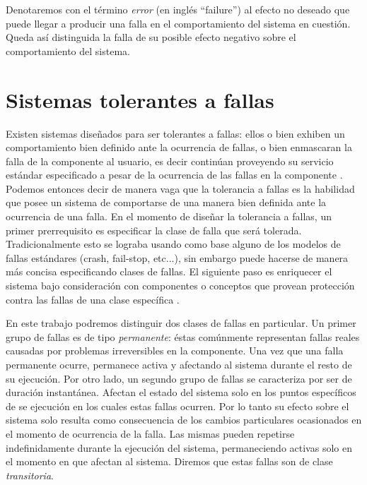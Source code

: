 \documentclass[titlepage, 12pt]{book}
\begin{document}
Denotaremos con el t\'ermino \textit{error} (en ingl\'es ``failure'') al efecto no deseado que puede llegar a producir una falla en el comportamiento del sistema en cuesti\'on. Queda as\'i distinguida la falla de su posible efecto negativo sobre el comportamiento del sistema.






\section{Sistemas tolerantes a fallas}
Existen sistemas dise\~nados para ser tolerantes a fallas: ellos o bien exhiben un comportamiento bien definido ante la ocurrencia de fallas, o bien enmascaran la falla de la componente al usuario, es decir contin\'uan proveyendo su servicio est\'andar especificado a pesar de la ocurrencia de las fallas en la componente \cite{Cristian}. Podemos entonces decir de manera vaga que la tolerancia a fallas es la habilidad que posee un sistema de comportarse de una manera bien definida ante la ocurrencia de una falla. En el momento de dise\~nar la tolerancia a fallas, un primer prerrequisito es especificar la clase de falla que ser\'a tolerada. Tradicionalmente esto se lograba usando como base alguno de los modelos de fallas est\'andares (crash, fail-stop, etc...), sin embargo puede hacerse de manera m\'as concisa especificando clases de fallas. El siguiente paso es enriquecer el sistema bajo consideraci\'on con componentes o conceptos que provean protecci\'on contra las fallas de una clase espec\'ifica \cite{FaultInject}.

En este trabajo podremos distinguir dos clases de fallas en particular. Un primer grupo de fallas es de tipo \textit{permanente}: \'estas com\'unmente representan fallas reales causadas por problemas irreversibles en la componente. Una vez que una falla permanente ocurre, permanece activa y afectando al sistema durante el resto de su ejecuci\'on. Por otro lado, un segundo grupo de fallas se caracteriza por ser de duraci\'on instant\'anea. Afectan el estado del sistema solo en los puntos espec\'ificos de se ejecuci\'on en los cuales estas fallas ocurren. Por lo tanto su efecto sobre el sistema solo resulta como consecuencia de los cambios particulares ocasionados en el momento de ocurrencia de la falla. Las mismas pueden repetirse indefinidamente durante la ejecuci\'on del sistema, permaneciendo activas solo en el momento en que afectan al sistema. Diremos que estas fallas son de clase \textit{transitoria}.
\end{document}
